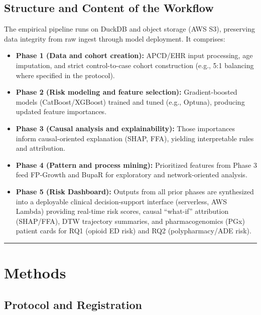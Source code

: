 \documentclass[
  12pt,
]{book}
\providecommand{\tightlist}{%
  \setlength{\itemsep}{0pt}\setlength{\parskip}{0pt}}
\begin{document}
\section{Structure and Content of the
Workflow}\label{structure-and-content-of-the-workflow}

The empirical pipeline runs on DuckDB and object storage (AWS S3),
preserving data integrity from raw ingest through model deployment. It
comprises:

\begin{itemize}
\tightlist
\item
  \textbf{Phase 1 (Data and cohort creation):} APCD/EHR input
  processing, age imputation, and strict control-to-case cohort
  construction (e.g., 5:1 balancing where specified in the protocol).
\item
  \textbf{Phase 2 (Risk modeling and feature selection):}
  Gradient-boosted models (CatBoost/XGBoost) trained and tuned (e.g.,
  Optuna), producing updated feature importances.
\item
  \textbf{Phase 3 (Causal analysis and explainability):} Those
  importances inform causal-oriented explanation (SHAP, FFA), yielding
  interpretable rules and attribution.
\item
  \textbf{Phase 4 (Pattern and process mining):} Prioritized features
  from Phase 3 feed FP-Growth and BupaR for exploratory and
  network-oriented analysis.
\item
  \textbf{Phase 5 (Risk Dashboard):} Outputs from all prior phases are
  synthesized into a deployable clinical decision-support interface
  (serverless, AWS Lambda) providing real-time risk scores, causal
  ``what-if'' attribution (SHAP/FFA), DTW trajectory summaries, and
  pharmacogenomics (PGx) patient cards for RQ1 (opioid ED risk) and RQ2
  (polypharmacy/ADE risk).
\end{itemize}

\begin{center}\rule{0.5\linewidth}{0.5pt}\end{center}

\chapter{Methods}\label{sec-methods}

\section{Protocol and Registration}\label{protocol-and-registration}
\end{document}
